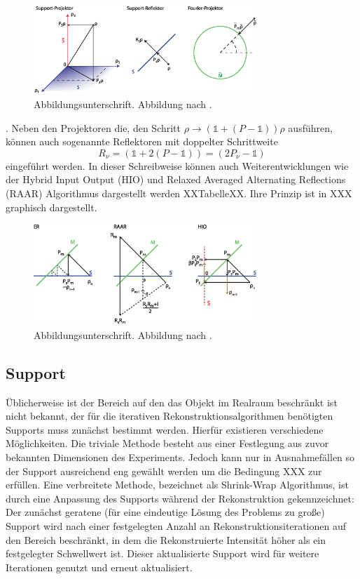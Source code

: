 	\begin{figure}
		\centering
		\includegraphics[width=0.75\textwidth]{images/projektor.eps}
		\caption[Abbildungstext im Abbildungsverzeichnis]{Abbildungsunterschrift. Abbildung nach \cite{B-SViel}.}
		\label{Abb:BspAbbildung}
	\end{figure}.
	Neben den Projektoren die, den Schritt $\rho\rightarrow (\mathbb{1}+(P-\mathbb{1}))\rho$ ausführen, können auch sogenannte Reflektoren mit doppelter Schrittweite
	\begin{equation}
	R_\nu= (\mathbb{1}+2(P-\mathbb{1}))=(2P_\nu-\mathbb{1})
	\end{equation}
	eingeführt werden.
In dieser Schreibweise können auch Weiterentwicklungen wie der Hybrid Input Output (HIO) und Relaxed Averaged Alternating Reflections (RAAR) Algorithmus dargestellt werden XXTabelleXX. Ihre Prinzip ist in XXX graphisch dargestellt.
	\begin{figure}
		\centering
		\includegraphics[width=0.75\textwidth]{images/algorithmen.eps}
		\caption[Abbildungstext im Abbildungsverzeichnis]{Abbildungsunterschrift. Abbildung nach \cite{B-SViel}.}
		\label{Abb:BspAbbildung}
	\end{figure} 
\subsection{Support}
Üblicherweise ist der Bereich auf den das Objekt im Realraum beschränkt ist nicht bekannt, der für die iterativen Rekonstruktionsalgorithmen benötigten Supports muss zunächst bestimmt werden. Hierfür existieren verschiedene Möglichkeiten. Die triviale Methode besteht aus einer Festlegung aus zuvor bekannten Dimensionen des Experiments. Jedoch kann nur in Ausnahmefällen so der Support ausreichend eng gewählt werden um die Bedingung XXX zur erfüllen.
Eine verbreitete Methode, bezeichnet als Shrink-Wrap Algorithmus, ist durch eine Anpassung des Supports während der Rekonstruktion gekennzeichnet: Der zunächst geratene (für eine eindeutige Lösung des Problems  zu große) Support wird nach einer festgelegten Anzahl an Rekonstruktionsiterationen auf den Bereich beschränkt, in dem die Rekonstruierte Intensität höher als ein festgelegter Schwellwert ist. Dieser aktualisierte Support wird für weitere Iterationen genutzt und erneut aktualisiert\cite{marchesini2003}.

